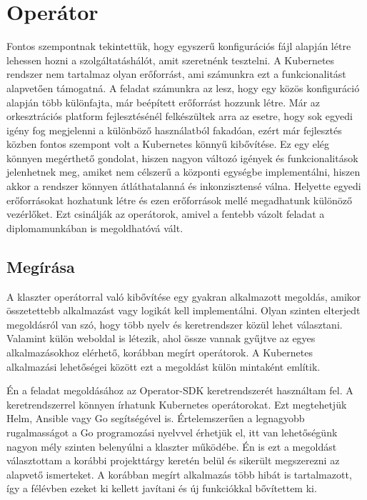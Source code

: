 \section{Operátor}
Fontos szempontnak tekintettük, hogy egyszerű konfigurációs fájl alapján létre lehessen hozni a szolgáltatáshálót, amit szeretnénk tesztelni.
A Kubernetes rendszer nem tartalmaz olyan erőforrást, ami számunkra ezt a funkcionalitást alapvetően támogatná.
A feladat számunkra az lesz, hogy egy közös konfiguráció alapján több különfajta, már beépített erőforrást hozzunk létre.
Már az orkesztrációs platform fejlesztésénél felkészültek arra az esetre, hogy sok egyedi igény fog megjelenni a különböző használatból fakadóan, ezért már fejlesztés közben fontos szempont volt a Kubernetes könnyű kibővítése.
Ez egy elég könnyen megérthető gondolat, hiszen nagyon változó igények és funkcionalitások jelenhetnek meg, amiket nem célszerű a központi egységbe implementálni, hiszen akkor a rendszer könnyen átláthatalanná és inkonzisztensé válna.
Helyette egyedi erőforrásokat hozhatunk létre és ezen erőforrások mellé megadhatunk különöző vezérlőket. Ezt csinálják az operátorok, amivel a fentebb vázolt feladat a diplomamunkában is megoldhatóvá vált.

\subsection{Megírása}
A klaszter operátorral való kibővítése egy gyakran alkalmazott megoldás, amikor összetettebb alkalmazást vagy logikát kell implementálni. Olyan szinten elterjedt megoldásról van szó, hogy több nyelv és keretrendszer közül lehet választani\citep{availableOperatorFrameworks}. Valamint külön weboldal is létezik, ahol össze vannak gyűjtve az egyes alkalmazásokhoz elérhető, korábban megírt operátorok.\citep{operatorhub} A Kubernetes alkalmazási lehetőségei között ezt a megoldást külön mintaként említik.\citep{KubernetesPatterns} 

Én a feladat megoldásához az Operator-SDK\citep{operatorSDK} keretrendszerét használtam fel. A keretrendszerrel könnyen írhatunk Kubernetes operátorokat. Ezt megtehetjük Helm, Ansible vagy Go segítségével is. Értelemszerűen a legnagyobb rugalmasságot a Go programozási nyelvvel érhetjük el, itt van lehetőségünk nagyon mély szinten belenyúlni a klaszter működébe. Én is ezt a megoldást választottam a korábbi projekttárgy keretén belül és sikerült megszerezni az alapvető ismerteket. A korábban megírt alkalmazás több hibát is tartalmazott, így a félévben ezeket ki kellett javítani és új funkciókkal bővítettem ki. 


